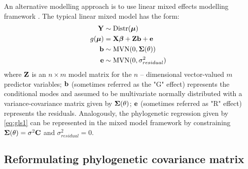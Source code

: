 \documentclass[12pt]{article}
\begin{document}
An alternative modelling approach is to use linear mixed effects modelling framework \citep{lynch1991methods}.
The typical linear mixed model has the form:
\begin{align}
{\mathbf Y} & \sim \textrm{Distr}({\boldsymbol \mu}) \label{eq:glmm1} \\
g({\boldsymbol \mu}) & = {\mathbf X} {\boldsymbol \beta} + {\mathbf Z} {\mathbf b} + {\mathbf e} \label{eq:glmm2} \\
{\mathbf b} & \sim \textrm{MVN}(0, {\boldsymbol \Sigma}(\theta)) \label{eq:glmm3} \\
{\mathbf e} & \sim \textrm{MVN}(0, \sigma^2_{residual} \label{eq:glmm4})
\end{align}
where ${\mathbf Z}$ is an $n \times m$ model matrix for the $n$ -- dimensional vector-valued $m$ predictor variables; ${\mathbf b}$ (sometimes referred as the "G" effect) represents the conditional modes and assumed to be multivariate normally distributed with a variance-covariance matrix given by ${\boldsymbol \Sigma}(\theta)$; ${\mathbf e}$ (sometimes referred as "R" effect) represents the residuals.
Analogously, the phylogenetic regression given by \ref{eq:gls1} can be represented in the mixed model framework by constraining ${\boldsymbol \Sigma}(\theta) = \sigma^2 {\mathbf C}$ and $\sigma^2_{residual} = 0$.


\subsection{Reformulating phylogenetic covariance matrix}
\end{document}

